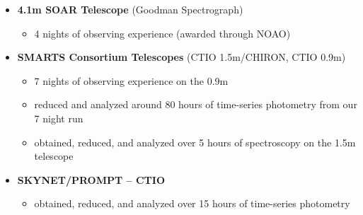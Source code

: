 \documentclass[letterpaper,12pt]{article}
\begin{document}
\vspace{3mm}
\noindent{}
\vspace{-6mm}
\begin{itemize}
    \item \textbf{4.1m SOAR Telescope} (Goodman Spectrograph)
    \begin{itemize}\vspace{-3mm}
        \item 4 nights of observing experience (awarded through NOAO)
    \end{itemize}
    \item \textbf{SMARTS Consortium Telescopes} (CTIO 1.5m/CHIRON, CTIO 0.9m)
    \begin{itemize}\vspace{-3mm}
        \item 7 nights of observing experience on the 0.9m
        \item reduced and analyzed around 80 hours of time-series photometry from our 7 night run
        \item obtained, reduced, and analyzed over 5 hours of spectroscopy on the 1.5m telescope
    \end{itemize}
    \item \textbf{SKYNET/PROMPT -- CTIO}
    \begin{itemize}\vspace{-3mm}
        \item obtained, reduced, and analyzed over 15 hours of time-series photometry
    \end{itemize}
\end{itemize}

\vspace{3mm}
\noindent{}
\end{document}
